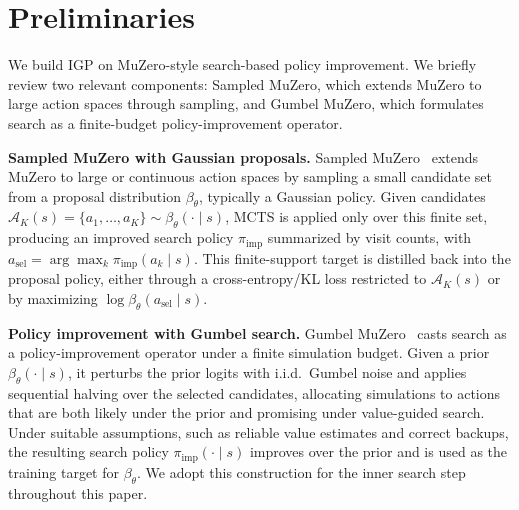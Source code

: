 \section{Preliminaries}

We build IGP on MuZero-style search-based policy improvement. We briefly review two relevant components: Sampled MuZero, which extends MuZero to large action spaces through sampling, and Gumbel MuZero, which formulates search as a finite-budget policy-improvement operator.

\textbf{Sampled MuZero with Gaussian proposals.}
Sampled MuZero~\citep{hubert2021learning} extends MuZero to large or continuous action spaces by sampling a small candidate set from a proposal distribution $\beta_\theta$, typically a Gaussian policy. Given candidates $\mathcal{A}_K(s)=\{a_1,\dots,a_K\}\sim \beta_\theta(\cdot\mid s)$, MCTS is applied only over this finite set, producing an improved search policy $\pi_{\mathrm{imp}}$ summarized by visit counts, with $a_{\mathrm{sel}}=\arg\max_k \pi_{\mathrm{imp}}(a_k\mid s)$. This finite-support target is distilled back into the proposal policy, either through a cross-entropy/KL loss restricted to $\mathcal{A}_K(s)$ or by maximizing $\log\beta_\theta(a_{\mathrm{sel}}\mid s)$.

\textbf{Policy improvement with Gumbel search.}
Gumbel MuZero~\citep{danihelka2022policy} casts search as a policy-improvement operator under a finite simulation budget. Given a prior $\beta_\theta(\cdot\mid s)$, it perturbs the prior logits with i.i.d.\ Gumbel noise and applies sequential halving over the selected candidates, allocating simulations to actions that are both likely under the prior and promising under value-guided search. Under suitable assumptions, such as reliable value estimates and correct backups, the resulting search policy $\pi_{\mathrm{imp}}(\cdot\mid s)$ improves over the prior and is used as the training target for $\beta_\theta$. We adopt this construction for the inner search step throughout this paper.